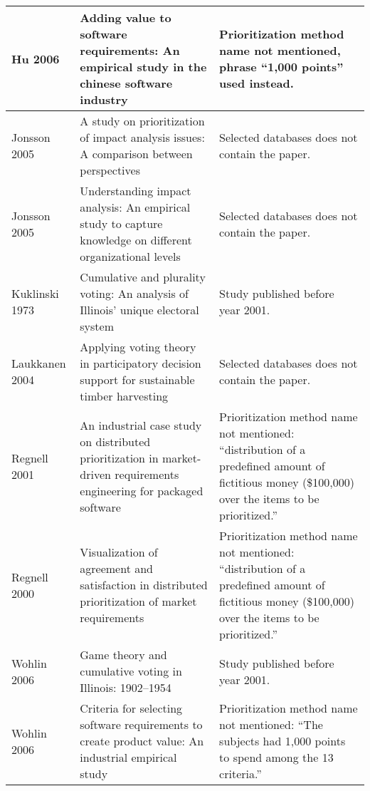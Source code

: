 {\begin{tabular}{
|>{\raggedright}p{}
|>{\raggedright}p{}
|>{\raggedright}p{}
|}
Hu 2006 \cite{Hu2006} & Adding value to software requirements: An empirical study in the chinese software industry & 
Prioritization method name not mentioned, phrase ``1,000 points'' used instead.
\tabularnewline \hline

Jonsson 2005 \cite{Jonsson2005} & A study on prioritization of impact analysis issues: A comparison between perspectives &
Selected databases does not contain the paper.
\tabularnewline \hline

Jonsson 2005 \cite{Jonsson2005a} & Understanding impact analysis: An empirical study to capture knowledge on different organizational levels &
Selected databases does not contain the paper.
\tabularnewline \hline

Kuklinski 1973 \cite{Kuklinski1973} & Cumulative and plurality voting: An analysis of Illinois' unique electoral system &
Study published before year 2001.
\tabularnewline \hline

Laukkanen 2004 \cite{Laukkanen2004} & Applying voting theory in participatory decision support for sustainable timber harvesting &
Selected databases does not contain the paper.
\tabularnewline \hline

Regnell 2001 \cite{Regnell2001} & An industrial case study on distributed prioritization in market-driven requirements engineering for packaged software &
Prioritization method name not mentioned: ``distribution of a predefined amount of fictitious money (\$100,000) over the items to be prioritized.''
\tabularnewline \hline

Regnell 2000 \cite{Regnell2000} & Visualization of agreement and satisfaction in distributed prioritization of market requirements &
Prioritization method name not mentioned: ``distribution of a predefined amount of fictitious money (\$100,000) over the items to be prioritized.''
\tabularnewline \hline

Wohlin 2006 \cite{Sawyer1962} & Game theory and cumulative voting in Illinois: 1902--1954 &
Study published before year 2001.
\tabularnewline \hline

Wohlin 2006 \cite{Wohlin2006} & Criteria for selecting software requirements to create product value: An industrial empirical study &
Prioritization method name not mentioned: ``The subjects had 1,000 points to spend among the 13 criteria.''
\tabularnewline \hline

\end{tabular}
}

